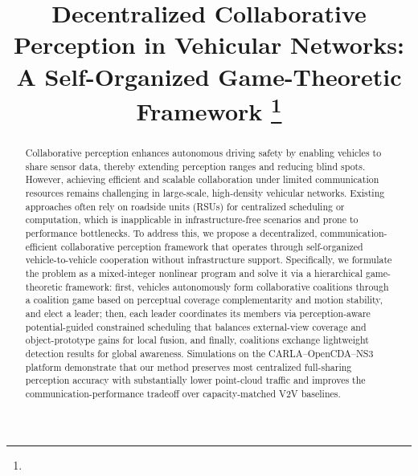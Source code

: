 \documentclass[conference]{IEEEtran}
\begin{document}
\title{Decentralized Collaborative Perception in Vehicular Networks: A Self-Organized Game-Theoretic Framework
\thanks{
}
}


\maketitle

\begin{abstract}
Collaborative perception enhances autonomous driving safety by enabling vehicles to share sensor data, thereby extending perception ranges and reducing blind spots. However, achieving efficient and scalable collaboration under limited communication resources remains challenging in large-scale, high-density vehicular networks. Existing approaches often rely on roadside units (RSUs) for centralized scheduling or computation, which is inapplicable in infrastructure-free scenarios and prone to performance bottlenecks. To address this, we propose a decentralized, communication-efficient collaborative perception framework that operates through self-organized vehicle-to-vehicle cooperation without infrastructure support. Specifically, we formulate the problem as a mixed-integer nonlinear program and solve it via a hierarchical game-theoretic framework: first, vehicles autonomously form collaborative coalitions through a coalition game based on perceptual coverage complementarity and motion stability, and elect a leader; then, each leader coordinates its members via perception-aware potential-guided constrained scheduling that balances external-view coverage and object-prototype gains for local fusion, and finally, coalitions exchange lightweight detection results for global awareness. Simulations on the CARLA–OpenCDA–NS3 platform demonstrate that our method preserves most centralized full-sharing perception accuracy with substantially lower point-cloud traffic and improves the communication-performance tradeoff over capacity-matched V2V baselines.
\end{abstract}
\end{document}
